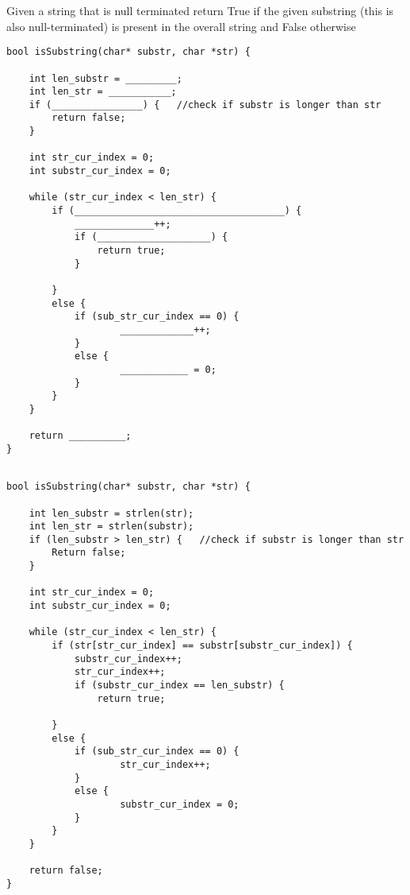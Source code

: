 \begin{blocksection}
\question
Given a string that is null terminated return True if the given substring (this is also null-terminated) is present in the overall string and False otherwise

\begin{verbatim}
bool isSubstring(char* substr, char *str) {

    int len_substr = _________;
    int len_str = ___________;
    if (________________) {   //check if substr is longer than str
        return false;
    }   
    
    int str_cur_index = 0;
    int substr_cur_index = 0;

    while (str_cur_index < len_str) {
        if (_____________________________________) {
            ______________++;
            if (____________________) {
                return true;
            }

        }
        else {
            if (sub_str_cur_index == 0) {
                    _____________++;
            }
            else {
                    ____________ = 0;
            }
        }
    }

    return __________;
}


\end{verbatim}
\end{blocksection}
\begin{solution}
\newpage
\begin{verbatim}
bool isSubstring(char* substr, char *str) {

    int len_substr = strlen(str);
    int len_str = strlen(substr);
    if (len_substr > len_str) {   //check if substr is longer than str
        Return false;
    }   
    
    int str_cur_index = 0;
    int substr_cur_index = 0;

    while (str_cur_index < len_str) {
        if (str[str_cur_index] == substr[substr_cur_index]) {
            substr_cur_index++;
            str_cur_index++;
            if (substr_cur_index == len_substr) {
                return true;
            
        }
        else {
            if (sub_str_cur_index == 0) {
                    str_cur_index++;
            }
            else {
                    substr_cur_index = 0;
            }
        }
    }

    return false;
}
\end{verbatim}
\end{solution}